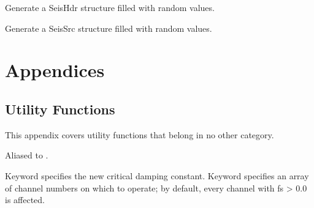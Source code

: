 \documentclass[letterpaper,11pt,english]{sphinxmanual}
\begin{document}
Generate a SeisHdr structure filled with random values.

\begin{fulllineitems}
\label{\detokenize{src/Submodules/randseis:randSeisSrc}}
\end{fulllineitems}


Generate a SeisSrc structure filled with random values.


\chapter{Appendices}
\label{\detokenize{index:appendices}}

\section{Utility Functions}
\label{\detokenize{src/Appendices/function_list:utility-functions}}\label{\detokenize{src/Appendices/function_list:function-list}}\label{\detokenize{src/Appendices/function_list::doc}}
This appendix covers utility functions that belong in no other category.


\begin{fulllineitems}
\end{fulllineitems}


\begin{fulllineitems}
\label{\detokenize{src/Appendices/function_list:d2u}}
\end{fulllineitems}


Aliased to .

Keyword  specifies the new critical damping constant. Keyword  specifies an array of channel numbers on which to operate; by default, every channel with fs \textgreater{} 0.0 is affected.

\begin{fulllineitems}
\label{\detokenize{src/Appendices/function_list:fctoresp}}
\end{fulllineitems}
\end{document}
